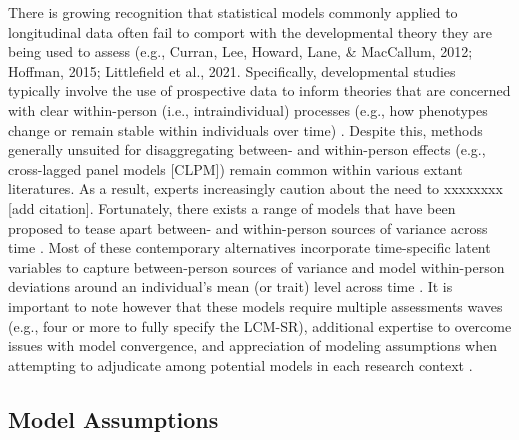 \documentclass[
  10pt,
  letterpaper,
]{article}
\begin{document}
There is growing recognition that statistical models commonly applied to
longitudinal data often fail to comport with the developmental theory
they are being used to assess (e.g., Curran, Lee, Howard, Lane, \&
MacCallum, 2012; Hoffman, 2015; Littlefield et al., 2021. Specifically,
developmental studies typically involve the use of prospective data to
inform theories that are concerned with clear within-person (i.e.,
intraindividual) processes (e.g., how phenotypes change or remain stable
within individuals over time) \citep[e.g., see][]{curran2011}. Despite
this, methods generally unsuited for disaggregating between- and
within-person effects (e.g., cross-lagged panel models {[}CLPM{]})
remain common within various extant literatures. As a result, experts
increasingly caution about the need to xxxxxxxx {[}add citation{]}.
Fortunately, there exists a range of models that have been proposed to
tease apart between- and within-person sources of variance across time
\citep[see][]{littlefield20210603, orth2021}. Most of these contemporary
alternatives incorporate time-specific latent variables to capture
between-person sources of variance and model within-person deviations
around an individual's mean (or trait) level across time
\citetext{\citealp[e.g.,
RI-CLPM,][]{hamaker2015}; \citealp[LCM-SR,][]{curran2014a}}. It is
important to note however that these models require multiple assessments
waves (e.g., four or more to fully specify the LCM-SR), additional
expertise to overcome issues with model convergence, and appreciation of
modeling assumptions when attempting to adjudicate among potential
models in each research context \citep[see][for further
discussion]{littlefield20210603}.

\hypertarget{model-assumptions}{%
\subsection{Model Assumptions}\label{model-assumptions}}
\end{document}
